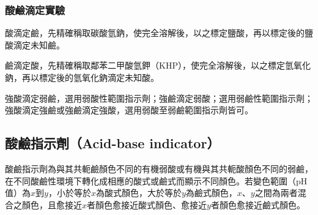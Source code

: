 \documentclass[a4paper,12pt]{article}
\begin{document}
\subsubsection{酸鹼滴定實驗}
\bit
\item 酸滴定鹼，先精確稱取碳酸氫鈉，使完全溶解後，以之標定鹽酸，再以標定後的鹽酸滴定未知鹼。
\item 鹼滴定酸，先精確稱取鄰苯二甲酸氫鉀（KHP），使完全溶解後，以之標定氫氧化鈉，再以標定後的氫氧化鈉滴定未知酸。
\item 強酸滴定弱鹼，選用弱酸性範圍指示劑；強鹼滴定弱酸；選用弱鹼性範圍指示劑；強酸滴定強鹼或強鹼滴定強酸，選用弱酸至弱鹼範圍指示劑皆可。
\eit
\subsection{酸鹼指示劑（Acid-base indicator）}
酸鹼指示劑為與其共軛鹼顏色不同的有機弱酸或有機與其共軛酸顏色不同的弱鹼，在不同酸鹼性環境下轉化成相應的酸式或鹼式而顯示不同顏色。若變色範圍（pH 值）為$x$到$y$，小於等於$x$為酸式顏色，大於等於$y$為鹼式顏色，$x$、$y$之間為兩者混合之顏色，且愈接近$x$者顏色愈接近酸式顏色、愈接近$y$者顏色愈接近鹼式顏色。
\end{document}

